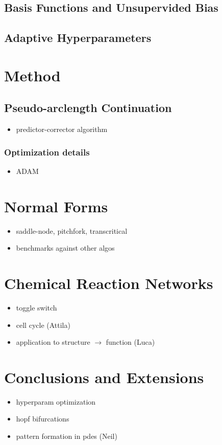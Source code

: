 \subsection{Basis Functions and Unsupervided Bias}

\subsection{Adaptive Hyperparameters}


\section{Method}

\subsection{Pseudo-arclength Continuation}
\label{sec:continuation}

\begin{itemize}
    \item predictor-corrector algorithm
    \end{itemize}

\subsubsection{Optimization details}

\begin{itemize}
    \item ADAM
\end{itemize}

\section{Normal Forms}
\label{sec:normal-forms}

\begin{itemize}
    \item saddle-node, pitchfork, transcritical
    \item benchmarks against other algos
\end{itemize}


\section{Chemical Reaction Networks}
\label{sec:networks}

\begin{itemize}
    \item toggle switch
    \item cell cycle (Attila)
    \item application to structure $\rightarrow$ function (Luca)
\end{itemize}

\section{Conclusions and Extensions}
\label{sec:conclusions}

\begin{itemize}
    \item hyperparam optimization
    \item hopf bifurcations
    \item pattern formation in pdes (Neil)
\end{itemize}




